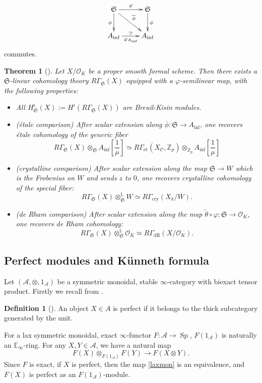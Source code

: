 \documentclass[11pt]{amsart}
\newcommand{\Z}{\mathbb{Z}}
\newcommand{\sO}{\mathcal{O}}
\newcommand{\cry}{\operatorname{cry}}
\newcommand{\et}{{\operatorname{\acute{e}t}}}
\newcommand{\ol}{\overline}
\newcommand{\Ainf}{A_{\operatorname{inf}}}
\newcommand{\Ainfmu}{A_{\operatorname{inf}}[\frac{1}{ \mu }]}
\newcommand{\Cu}{\mathcal{C}}
\newcommand{\mS}{\mathfrak{S}}
\newcounter{spec}
\newcommand{\Sp}{\operatorname{Sp}}
\newtheorem{thm}[lemma]{Theorem}
\theoremstyle{definition}
\newtheorem{defn}[lemma]{Definition}
\theoremstyle{remark}
\numberwithin{equation}{section}
\begin{document}
\begin{equation}\label{SAinfdiag}
\xymatrix
{\mS \ar[r]^{\varphi} \ar[d]_{\phi} \ar[rd]^{\ol{\phi}}& \mS \ar[d]^{\phi} \\
\Ainf \ar[r]_{\varphi_{\Ainf}}^{\simeq } & \Ainf
}
\end{equation}
commutes.
\begin{thm}[{\cite{BMS2}}]\label{BKcoh}
 Let $X/\sO_K$ be a proper smooth formal scheme. Then there exists a $\mS$-linear cohomology theory $R\Gamma_{\mS}(X)$ equipped with a $\varphi$-semilinear map, with the following properties:
 \begin{itemize}
   \item[(1)] All $H^i_\mS(X) :=H^i(R\Gamma_\mS(X))$ are Breuil-Kisin modules.
   \item[(2)] (\'etale comparison) After scalar extension along $\ol{\phi}:\mS\to \Ainf$, one recovers \'etale cohomology of the generic fiber
   \[
   R\Gamma_{\mS}(X) \otimes_{\mS} \Ainfmu \simeq R\Gamma_{\et}(X_\Cu,\Z_p)\otimes_{\Z_p} \Ainfmu 
   \]
   \item[(3)] (crystalline comparison) After scalar extension along the map $\mS\to W$ which is the Frobenius on $W$ and sends $z$ to $0$, one recovers crystalline cohomology of the special fiber:
   \[
   R\Gamma_\mS(X)\otimes_{\mS}^{\mathbb{L}}W \simeq R\Gamma_{\cry}(X_k/W).
   \]
   \item[(4)] (de Rham comparison) After scalar extension along the map $\tilde{\theta}\circ \varphi:\mS \to \sO_K$, one recovers de Rham cohomology:
   \[
   R\Gamma_{\mS}(X)\otimes_{\mS}^{\mathbb{L}}\sO_K \simeq R\Gamma_{\text{dR}}(X/\sO_K).
   \]
   \end{itemize}
\end{thm}

\subsection{Perfect modules and K\"unneth formula} Let $(\mathcal{A},\otimes,1_{\mathcal{A}})$ be a symmetric monoidal, stable $\infty$-category with biexact tensor product. Firstly we recall from \cite[section 1]{KunnethTP}.
\begin{defn}[{\cite[Definition 1.2]{KunnethTP}}]
  An object $X\in A$ is perfect if it belongs to the thick subcategory generated by the unit.
\end{defn}
For a lax symmetric monoidal, exact $\infty$-functor $F:\mathcal{A} \to \Sp$, $F(1_{\mathcal{A}})$ is naturally an $\mathbb{E}_\infty$-ring. For any $X,Y\in \mathcal{A}$, we have a natural map
\begin{equation}\label{laxmon}
F(X)\otimes_{F(1_{\mathcal{A}})} F(Y) \to F(X\otimes Y).
\end{equation}
Since $F$ is exact, if $X$ is perfect, then the map \eqref{laxmon} is an equivalence, and $F(X)$ is perfect as an $F(1_{\mathcal{A}})$-module. 
\end{document}
